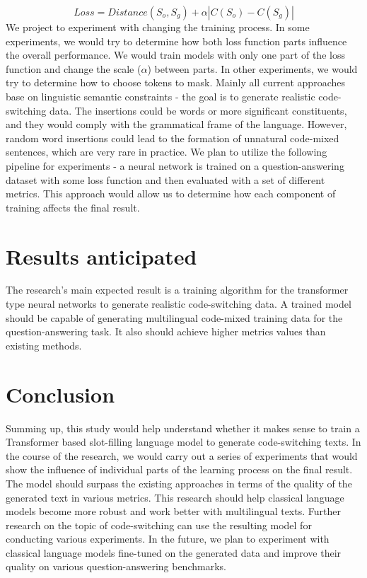 \documentclass[conference]{IEEEtran}
\begin{document}
$$Loss = Distance(S_{o}, S_{g}) + \alpha \left| C(S_{o}) - C(S_{g}) \right|$$
\newline\indent We project to experiment with changing the training process. In some experiments, we would try to determine how both loss function parts influence the overall performance. We would train models with only one part of the loss function and change the scale ($\alpha$) between parts. In other experiments, we would try to determine how to choose tokens to mask. Mainly all current approaches base on linguistic semantic constraints - the goal is to generate realistic code-switching data. The insertions could be words or more significant constituents, and they would comply with the grammatical frame of the language. However, random word insertions could lead to the formation of unnatural code-mixed sentences, which are very rare in practice.
\newline\indent We plan to utilize the following pipeline for experiments - a neural network is trained on a question-answering dataset with some loss function and then evaluated with a set of different metrics. This approach would allow us to determine how each component of training affects the final result. 

\section{Results anticipated}

The research's main expected result is a training algorithm for the transformer type neural networks to generate realistic code-switching data. A trained model should be capable of generating multilingual code-mixed training data for the question-answering task. It also should achieve higher metrics values than existing methods.

\section{Conclusion}

Summing up, this study would help understand whether it makes sense to train a Transformer based slot-filling language model to generate code-switching texts. In the course of the research, we would carry out a series of experiments that would show the influence of individual parts of the learning process on the final result. The model should surpass the existing approaches in terms of the quality of the generated text in various metrics.
\newline\indent This research should help classical language models become more robust and work better with multilingual texts. Further research on the topic of code-switching can use the resulting model for conducting various experiments.
\newline\indent In the future, we plan to experiment with classical language models fine-tuned on the generated data and improve their quality on various question-answering benchmarks.
\end{document}
